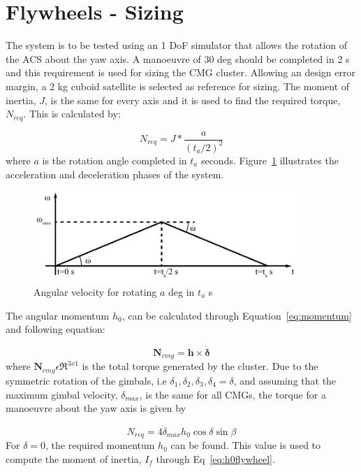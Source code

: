\documentclass[aerospace,article,submit,moreauthors,dvi2pdf]{Definitions/mdpi}
\begin{document}
\section{Flywheels - Sizing}
The system is to be tested using an 1 DoF simulator that allows the rotation of the ACS about the yaw axis. A manoeuvre of 30 deg should be completed in 2 s and this requirement is used for sizing the CMG cluster.
Allowing an design error margin, a 2 kg cuboid satellite is selected as reference for sizing. The moment of inertia, $J$, is the same for every axis and it is used to find the required torque, $N_{req}$. This is calculated by:

\begin{equation}
N_{req}=J*\frac{a}{(t_a/2)^2}
\end{equation}
where $a$ is the rotation angle completed in $t_a$ seconds. Figure~\ref{fig:angvel} illustrates the acceleration and deceleration phases of the system.

\begin{figure}[H]
\includegraphics[width=10cm]{wmega_sizing.pdf}
\caption{Angular velocity for rotating $a$ deg in $t_a$ s \label{fig:angvel}}
\end{figure}
The angular momentum $h_{0}$, can be calculated through Equation~\ref{eq:momentum} and following equation:

\begin{equation}
\textbf{N}_{cmg}=\textbf{h}\times \dot{\boldsymbol{\delta}}
\end{equation}
where $\textbf{N}_{cmg} \epsilon {\Re}^{3x1}$ is the total torque generated by the cluster. Due to the symmetric rotation of the gimbals, i.e $\delta_1, \delta_2,\delta_3, \delta_4=\delta$, and assuming that the maximum gimbal velocity, $\delta_{max}$, is the same for all CMGs, the torque for a manoeuvre about the yaw axis is given by 

\begin{equation}
N_{req}=4\dot\delta_{max} h_0 \cos\delta \sin\beta
\end{equation}
For $\delta=0$, the required momentum $h_0$ can be found. This value is used to compute the moment of inertia, $I_f$ through Eq~\ref{eq:h0flywheel}. 
\end{document}
